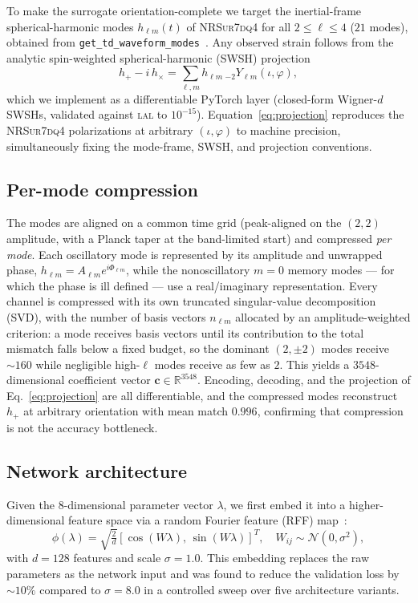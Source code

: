 \documentclass[aps,prd,twocolumn,superscriptaddress,longbibliography]{revtex4-2}
\newcommand{\NRSur}{\textsc{NRSur7dq4}}
\begin{document}
To make the surrogate orientation-complete we target the inertial-frame
spherical-harmonic modes $h_{\ell m}(t)$ of \NRSur{} for all
$2\leq\ell\leq4$ ($21$ modes), obtained from
\texttt{get\_td\_waveform\_modes}~\cite{Usman:2016}. Any observed strain
follows from the analytic spin-weighted spherical-harmonic (SWSH)
projection
\begin{equation}
  h_+ - i\,h_\times = \sum_{\ell,m} h_{\ell m}\,
    {}_{-2}Y_{\ell m}(\iota,\varphi),
  \label{eq:projection}
\end{equation}
which we implement as a differentiable PyTorch layer (closed-form Wigner-$d$
SWSHs, validated against \textsc{lal} to $10^{-15}$). Equation~\eqref{eq:projection}
reproduces the \NRSur{} polarizations at arbitrary $(\iota,\varphi)$ to
machine precision, simultaneously fixing the mode-frame, SWSH, and projection
conventions.

\subsection{Per-mode compression}
\label{sec:svd}

The modes are aligned on a common time grid (peak-aligned on the $(2,2)$
amplitude, with a Planck taper at the band-limited start) and compressed
\emph{per mode}. Each oscillatory mode is represented by its amplitude and
unwrapped phase, $h_{\ell m}=A_{\ell m}e^{i\Phi_{\ell m}}$, while the
nonoscillatory $m=0$ memory modes --- for which the phase is ill defined ---
use a real/imaginary representation. Every channel is compressed with its own
truncated singular-value decomposition (SVD), with the number of basis vectors
$n_{\ell m}$ allocated by an amplitude-weighted criterion: a mode receives
basis vectors until its contribution to the total mismatch falls below a fixed
budget, so the dominant $(2,\pm2)$ modes receive ${\sim}160$ while negligible
high-$\ell$ modes receive as few as $2$. This yields a
$3548$-dimensional coefficient vector
$\mathbf{c}\in\mathbb{R}^{3548}$. Encoding, decoding, and the projection of
Eq.~\eqref{eq:projection} are all differentiable, and the compressed modes
reconstruct $h_+$ at arbitrary orientation with mean match $0.996$, confirming
that compression is not the accuracy bottleneck.

\subsection{Network architecture}
\label{sec:arch}

Given the 8-dimensional parameter vector $\lambda$, we first
embed it into a higher-dimensional feature space via a
random Fourier feature (RFF) map~\cite{Rahimi:2007,Tancik:2020}:
\begin{equation}
  \phi(\lambda) = \sqrt{\tfrac{2}{d}}
    \left[\cos(W\lambda),\,\sin(W\lambda)\right]^T\!,
  \quad W_{ij}\sim\mathcal{N}(0,\sigma^2),
\end{equation}
with $d=128$ features and scale $\sigma=1.0$.
This embedding replaces the raw parameters as the network input
and was found to reduce the validation loss by $\sim\!10\%$
compared to $\sigma=8.0$ in a controlled sweep
over five architecture variants.
\end{document}
